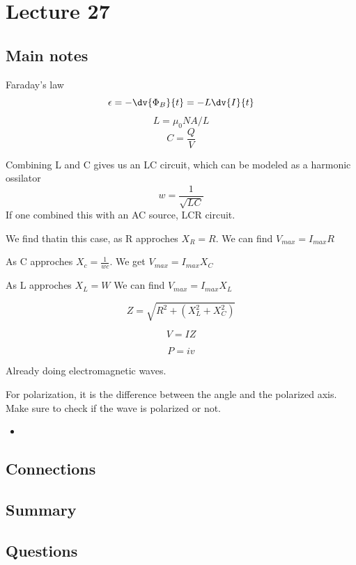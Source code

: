 \section{Lecture 27}
\subsection{Main notes}
Faraday's law
\[
\epsilon = - \dv{\Phi_B}{t} = -L \dv{I}{t}
  \]
\[
L = \mu_0 NA/L
  \]
\[
C = \frac{Q}{V}
  \]

  Combining L and C gives us an LC circuit, which can be modeled as a harmonic ossilator
\[
w = \frac{1}{\sqrt{LC}}
  \]
  If one combined this with an AC source, LCR circuit.

  We find thatin this case, as R approches $X_R = R$. We can find $V_{max} = I_{max}R$

  As C approches $X_c = \frac{1}{wc}$. We get $V_{max} = I_{max}X_C$

As L approches $X_L = W$ We can find $V_{max} = I_{max}X_L$

\[
Z = \sqrt{R^2 + (X_L^2 + X_C^2)}
  \]

\[
V = IZ
\]

\[
P=iv
\]

Already doing electromagnetic waves.

For polarization, it is the difference between the angle and the polarized axis. Make sure to check if the wave is polarized or not.
\begin{itemize}
	\item
\end{itemize}


\subsection{Connections}


\subsection{Summary}


\subsection{Questions}

